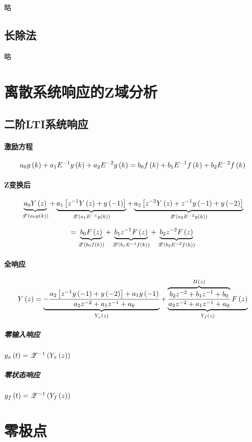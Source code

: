 \documentclass{article}
\begin{document}
略

\subsection{长除法}

略

\section{离散系统响应的Z域分析}

\subsection{二阶LTI系统响应}

\paragraph{激励方程}

\[a_0y\left(k\right)+a_1E^{-1}y\left(k\right)+a_2E^{-2}y\left(k\right)
    =b_0f\left(k\right)+b_1E^{-1}f\left(k\right)+b_2E^{-2}f\left(k\right)\]

\paragraph{Z变换后}

\[\underbrace{a_0Y\left(z\right)}_{\mathscr Z\left(a_0y\left(k\right)\right)}
    +\underbrace{a_1\left[{z^{-1}Y\left(z\right)+y\left(-1\right)}\right]}_{\mathscr Z\left(a_1E^{-1}y\left(k\right)\right)}
    +\underbrace{a_2\left[{z^{-2}Y\left(z\right)+z^{-1}y\left(-1\right)+y\left(-2\right)}\right]}_{\mathscr Z\left(a_2E^{-2}y\left(k\right)\right)}\]

\[=\underbrace{b_0F\left(z\right)}_{\mathscr Z\left(b_0f\left(k\right)\right)}
    +\underbrace{b_1z^{-1}F\left(z\right)}_{\mathscr Z\left(b_1E^{-1}f\left(k\right)\right)}
    +\underbrace{b_2z^{-2}F\left(z\right)}_{\mathscr Z\left(b_2E^{-2}f\left(k\right)\right)}\]

\paragraph{全响应}

\[Y\left(z\right)
    =\underbrace{-\frac{a_2\left[z^{-1}y\left(-1\right)+y\left(-2\right)\right]+a_1y\left(-1\right)}{a_2z^{-2}+a_1z^{-1}+a_0}}_{Y_x\left(z\right)}
    +\underbrace{\overbrace{\frac{b_2z^{-2}+b_1z^{-1}+b_0}{a_2z^{-2}+a_1z^{-1}+a_0}}^{H\left(z\right)}F\left(z\right)}_{Y_f\left(z\right)}\]

\subparagraph{零输入响应}

$y_x\left(t\right)=\mathscr Z^{-1}\left(Y_x\left(z\right)\right)$

\subparagraph{零状态响应}

$y_f\left(t\right)=\mathscr Z^{-1}\left(Y_f\left(z\right)\right)$

\section{零极点}
\end{document}
